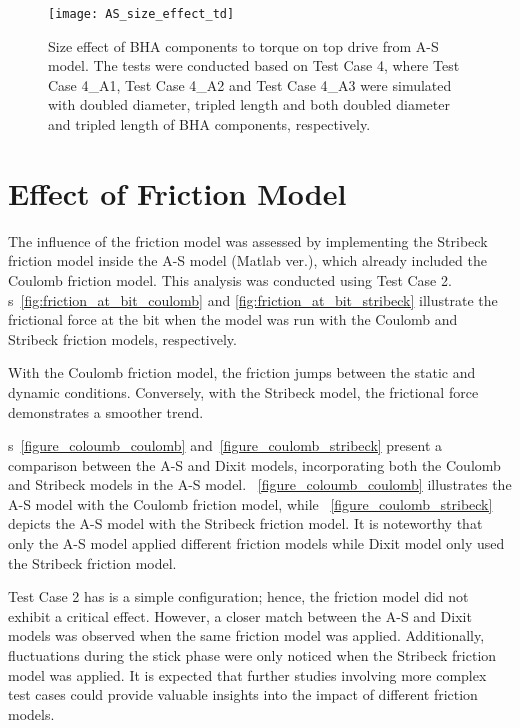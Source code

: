 \begin{figure}
	\centering
	\texttt{[image: AS\_size\_effect\_td]}
    \caption[Size effect of BHA components to a torque from A-S model]{Size effect of BHA components to torque on top drive from A-S model. The tests were conducted based on Test Case 4, where Test Case 4\_A1, Test Case 4\_A2 and Test Case 4\_A3 were simulated with doubled diameter, tripled length and both doubled diameter and tripled length of BHA components, respectively.}
	\label{figure_AS_BHA_size_effect_td}
\end{figure}


\section{Effect of Friction Model}
The influence of the friction model was assessed by implementing the Stribeck friction model inside the A-S model (Matlab ver.), which already included the Coulomb friction model. This analysis was conducted using Test Case 2. \figurename{}s~\ref{fig:friction_at_bit_coulomb} and \ref{fig:friction_at_bit_stribeck} illustrate the frictional force at the bit when the model was run with the Coulomb and Stribeck friction models, respectively.

With the Coulomb friction model, the friction jumps between the static and dynamic conditions.  Conversely, with the Stribeck model, the frictional force demonstrates a smoother trend.

\figurename{}s~\ref{figure_coloumb_coulomb} and~\ref{figure_coulomb_stribeck} present a comparison between the A-S and Dixit models, incorporating both the Coulomb and Stribeck models in the A-S model. \figurename{}~\ref{figure_coloumb_coulomb} illustrates the A-S model with the Coulomb friction model, while \figurename{}~\ref{figure_coulomb_stribeck} depicts the A-S model with the Stribeck friction model. It is noteworthy that only the A-S model applied different friction models while Dixit model only used the Stribeck friction model.

Test Case 2 has is a simple configuration; hence, the friction model did not exhibit a critical effect. However, a closer match between the A-S and Dixit models was observed when the same friction model was applied. Additionally, fluctuations during the stick phase were only noticed when the Stribeck friction model was applied. It is expected that further studies involving more complex test cases could provide valuable insights into the impact of different friction models.

